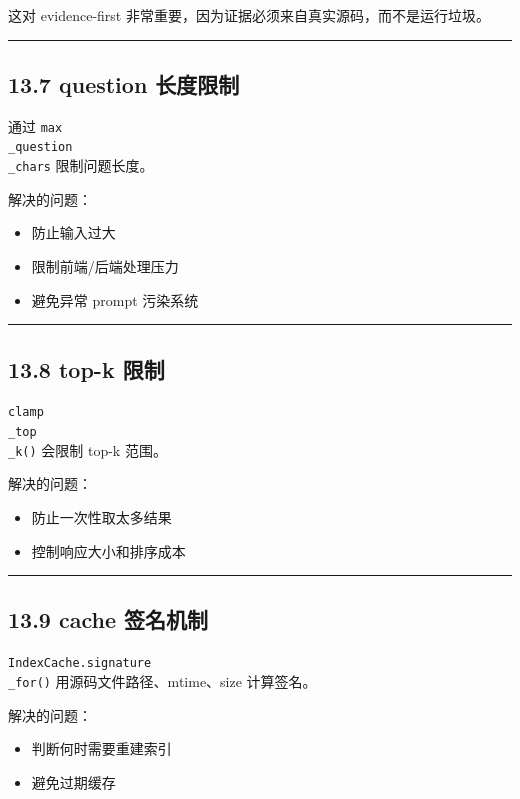 \documentclass[UTF8,12pt,openany]{ctexbook}
\begin{document}
这对 evidence-first 非常重要，因为证据必须来自真实源码，而不是运行垃圾。\par

\hrule

\subsection{13.7 question 长度限制}

通过 \texttt{max\\_question\\_chars} 限制问题长度。\par

解决的问题：\par

\begin{itemize}
\item 防止输入过大
\item 限制前端/后端处理压力
\item 避免异常 prompt 污染系统
\end{itemize}

\hrule

\subsection{13.8 top-k 限制}

\texttt{clamp\\_top\\_k()} 会限制 top-k 范围。\par

解决的问题：\par

\begin{itemize}
\item 防止一次性取太多结果
\item 控制响应大小和排序成本
\end{itemize}

\hrule

\subsection{13.9 cache 签名机制}

\texttt{IndexCache.signature\\_for()} 用源码文件路径、mtime、size 计算签名。\par

解决的问题：\par

\begin{itemize}
\item 判断何时需要重建索引
\item 避免过期缓存
\end{itemize}
\end{document}
